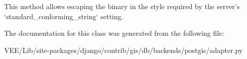 \begin{DoxyVerb}This method allows escaping the binary in the style required by the
server's `standard_conforming_string` setting.
\end{DoxyVerb}
 

The documentation for this class was generated from the following file\+:\begin{DoxyCompactItemize}
\item 
V\+E\+E/\+Lib/site-\/packages/django/contrib/gis/db/backends/postgis/adapter.\+py\end{DoxyCompactItemize}
